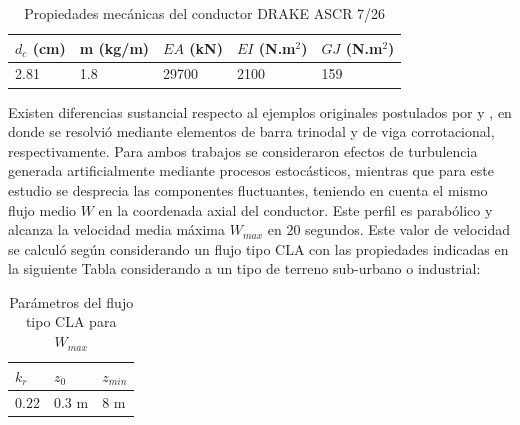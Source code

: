 \begin{table}[ht!]
	\begin{center}
		\begin{tabular}{ | m{2cm} | m{2cm} | m{2cm} | m{2cm} |  m{2cm} | }
			\hline $d_c$ (cm) & m (kg/m)& $EA$ (kN)& $EI$ (N.m$^2$)& $GJ$ (N.m$^2$)  \\ \hline
			2.81 & 1.8 & 29700 &2100 &159   \\ \hline
		\end{tabular}
	\end{center}
	\caption{Propiedades mecánicas del conductor DRAKE ASCR 7/26 }
	\label{table:RN:FotiCable:propiedadesCable}
\end{table}

Existen diferencias sustancial respecto al ejemplos originales postulados por \cite{luongo1998non} y \cite{martinelli2001numerical}, en donde se resolvió mediante elementos de barra trinodal y de viga corrotacional, respectivamente. Para ambos trabajos se consideraron efectos de turbulencia generada artificialmente mediante procesos estocásticos, mientras que para este estudio se desprecia las componentes fluctuantes, teniendo en cuenta el mismo flujo medio $W$  en la coordenada axial del conductor. Este perfil es parabólico y alcanza la velocidad media máxima $W_{max}$ en $20$ segundos. Este valor de velocidad se calculó según \citep{IEC60826} considerando un flujo tipo CLA con las propiedades indicadas en la siguiente Tabla considerando a un tipo de terreno sub-urbano o industrial:


\begin{table}[htbp]
	\begin{center}
		\begin{tabular}{ | m{2cm} | m{2cm} | m{2cm} | }
			\hline $k_r$ & $z_0$& $z_{min}$  \\ \hline
			$0.22$ &$0.3$ m & $8$ m     \\ \hline
		\end{tabular}
	\end{center}
	\caption{Parámetros del flujo tipo CLA para $W_{max}$ }
	\label{table:RN:propiedadesFlujo}
\end{table}

